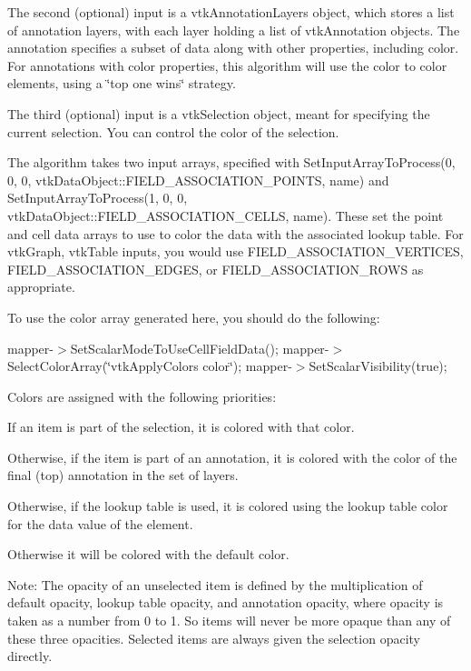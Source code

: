 The second (optional) input is a vtk\-Annotation\-Layers object, which stores a list of annotation layers, with each layer holding a list of vtk\-Annotation objects. The annotation specifies a subset of data along with other properties, including color. For annotations with color properties, this algorithm will use the color to color elements, using a \char`\"{}top one wins\char`\"{} strategy.

The third (optional) input is a vtk\-Selection object, meant for specifying the current selection. You can control the color of the selection.

The algorithm takes two input arrays, specified with Set\-Input\-Array\-To\-Process(0, 0, 0, vtk\-Data\-Object\-::\-F\-I\-E\-L\-D\-\_\-\-A\-S\-S\-O\-C\-I\-A\-T\-I\-O\-N\-\_\-\-P\-O\-I\-N\-T\-S, name) and Set\-Input\-Array\-To\-Process(1, 0, 0, vtk\-Data\-Object\-::\-F\-I\-E\-L\-D\-\_\-\-A\-S\-S\-O\-C\-I\-A\-T\-I\-O\-N\-\_\-\-C\-E\-L\-L\-S, name). These set the point and cell data arrays to use to color the data with the associated lookup table. For vtk\-Graph, vtk\-Table inputs, you would use F\-I\-E\-L\-D\-\_\-\-A\-S\-S\-O\-C\-I\-A\-T\-I\-O\-N\-\_\-\-V\-E\-R\-T\-I\-C\-E\-S, F\-I\-E\-L\-D\-\_\-\-A\-S\-S\-O\-C\-I\-A\-T\-I\-O\-N\-\_\-\-E\-D\-G\-E\-S, or F\-I\-E\-L\-D\-\_\-\-A\-S\-S\-O\-C\-I\-A\-T\-I\-O\-N\-\_\-\-R\-O\-W\-S as appropriate.

To use the color array generated here, you should do the following\-:

mapper-\/$>$Set\-Scalar\-Mode\-To\-Use\-Cell\-Field\-Data(); mapper-\/$>$Select\-Color\-Array(\char`\"{}vtk\-Apply\-Colors color\char`\"{}); mapper-\/$>$Set\-Scalar\-Visibility(true);

Colors are assigned with the following priorities\-: 
\begin{DoxyEnumerate}
\item If an item is part of the selection, it is colored with that color. 
\item Otherwise, if the item is part of an annotation, it is colored with the color of the final (top) annotation in the set of layers. 
\item Otherwise, if the lookup table is used, it is colored using the lookup table color for the data value of the element. 
\item Otherwise it will be colored with the default color. 
\end{DoxyEnumerate}

Note\-: The opacity of an unselected item is defined by the multiplication of default opacity, lookup table opacity, and annotation opacity, where opacity is taken as a number from 0 to 1. So items will never be more opaque than any of these three opacities. Selected items are always given the selection opacity directly.

